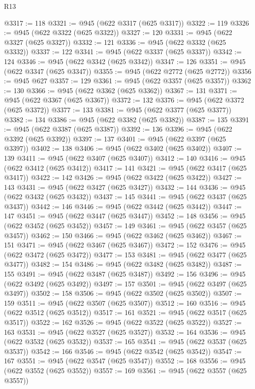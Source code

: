 \begin{lexlean}{R13}
\begin{coremodule}
@3317 := 118
@3321 := @945 (@622 @3317 (@625 @3317))
@3322 := 119
@3326 := @945 (@622 @3322 (@625 @3322))
@3327 := 120
@3331 := @945 (@622 @3327 (@625 @3327))
@3332 := 121
@3336 := @945 (@622 @3332 (@625 @3332))
@3337 := 122
@3341 := @945 (@622 @3337 (@625 @3337))
@3342 := 124
@3346 := @945 (@622 @3342 (@625 @3342))
@3347 := 126
@3351 := @945 (@622 @3347 (@625 @3347))
@3355 := @945 (@622 @2772 (@625 @2772))
@3356 := @945 @627
@3357 := 129
@3361 := @945 (@622 @3357 (@625 @3357))
@3362 := 130
@3366 := @945 (@622 @3362 (@625 @3362))
@3367 := 131
@3371 := @945 (@622 @3367 (@625 @3367))
@3372 := 132
@3376 := @945 (@622 @3372 (@625 @3372))
@3377 := 133
@3381 := @945 (@622 @3377 (@625 @3377))
@3382 := 134
@3386 := @945 (@622 @3382 (@625 @3382))
@3387 := 135
@3391 := @945 (@622 @3387 (@625 @3387))
@3392 := 136
@3396 := @945 (@622 @3392 (@625 @3392))
@3397 := 137
@3401 := @945 (@622 @3397 (@625 @3397))
@3402 := 138
@3406 := @945 (@622 @3402 (@625 @3402))
@3407 := 139
@3411 := @945 (@622 @3407 (@625 @3407))
@3412 := 140
@3416 := @945 (@622 @3412 (@625 @3412))
@3417 := 141
@3421 := @945 (@622 @3417 (@625 @3417))
@3422 := 142
@3426 := @945 (@622 @3422 (@625 @3422))
@3427 := 143
@3431 := @945 (@622 @3427 (@625 @3427))
@3432 := 144
@3436 := @945 (@622 @3432 (@625 @3432))
@3437 := 145
@3441 := @945 (@622 @3437 (@625 @3437))
@3442 := 146
@3446 := @945 (@622 @3442 (@625 @3442))
@3447 := 147
@3451 := @945 (@622 @3447 (@625 @3447))
@3452 := 148
@3456 := @945 (@622 @3452 (@625 @3452))
@3457 := 149
@3461 := @945 (@622 @3457 (@625 @3457))
@3462 := 150
@3466 := @945 (@622 @3462 (@625 @3462))
@3467 := 151
@3471 := @945 (@622 @3467 (@625 @3467))
@3472 := 152
@3476 := @945 (@622 @3472 (@625 @3472))
@3477 := 153
@3481 := @945 (@622 @3477 (@625 @3477))
@3482 := 154
@3486 := @945 (@622 @3482 (@625 @3482))
@3487 := 155
@3491 := @945 (@622 @3487 (@625 @3487))
@3492 := 156
@3496 := @945 (@622 @3492 (@625 @3492))
@3497 := 157
@3501 := @945 (@622 @3497 (@625 @3497))
@3502 := 158
@3506 := @945 (@622 @3502 (@625 @3502))
@3507 := 159
@3511 := @945 (@622 @3507 (@625 @3507))
@3512 := 160
@3516 := @945 (@622 @3512 (@625 @3512))
@3517 := 161
@3521 := @945 (@622 @3517 (@625 @3517))
@3522 := 162
@3526 := @945 (@622 @3522 (@625 @3522))
@3527 := 163
@3531 := @945 (@622 @3527 (@625 @3527))
@3532 := 164
@3536 := @945 (@622 @3532 (@625 @3532))
@3537 := 165
@3541 := @945 (@622 @3537 (@625 @3537))
@3542 := 166
@3546 := @945 (@622 @3542 (@625 @3542))
@3547 := 167
@3551 := @945 (@622 @3547 (@625 @3547))
@3552 := 168
@3556 := @945 (@622 @3552 (@625 @3552))
@3557 := 169
@3561 := @945 (@622 @3557 (@625 @3557))

\end{coremodule}
\end{lexlean}
